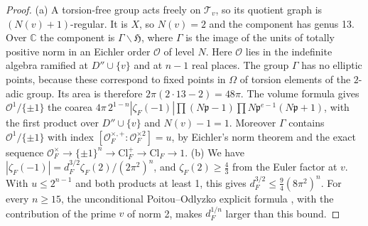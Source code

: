 \documentclass[11pt]{amsart}
\numberwithin{equation}{section}
\theoremstyle{plain}
\theoremstyle{definition}\newtheorem{definition}[theorem]{Definition}
\theoremstyle{remark}\newtheorem{remark}[theorem]{Remark}
\begin{document}
\begin{proof}
(a) A torsion-free group acts freely on $\mathcal T_v$, so its quotient graph is $(N(v)+1)$-regular. It is $X$, so $N(v)=2$ and the component has genus 13. Over $\mathbb C$ the component is $\Gamma\backslash\mathfrak H$, where $\Gamma$ is the image of the units of totally positive norm in an Eichler order $\mathcal O$ of level $N$. Here $\mathcal O$ lies in the indefinite algebra ramified at $D''\cup\{v\}$ and at $n-1$ real places. The group $\Gamma$ has no elliptic points, because these correspond to fixed points in $\Omega$ of torsion elements of the $2$-adic group. Its area is therefore $2\pi(2\cdot13-2)=48\pi$. The volume formula \cite{voight21} gives $\mathcal O^1/\{\pm1\}$ the coarea $4\pi\,2^{1-n}|\zeta_F(-1)|\prod(N\mathfrak p-1)\prod N\mathfrak p^{e-1}(N\mathfrak p+1)$, with the first product over $D''\cup\{v\}$ and $N(v)-1=1$. Moreover $\Gamma$ contains $\mathcal O^1/\{\pm1\}$ with index $[\mathcal O_F^{\times,+}:\mathcal O_F^{\times2}]=u$, by Eichler's norm theorem and the exact sequence $\mathcal O_F^\times\to\{\pm1\}^n\to\mathrm{Cl}^+_F\to\mathrm{Cl}_F\to1$.
(b) We have $|\zeta_F(-1)|=d_F^{3/2}\zeta_F(2)/(2\pi^2)^n$, and $\zeta_F(2)\ge\frac43$ from the Euler factor at $v$. With $u\le2^{n-1}$ and both products at least 1, this gives $d_F^{3/2}\le\frac94(8\pi^2)^n$. For every $n\ge15$, the unconditional Poitou--Odlyzko explicit formula \cite{poitou77,odlyzko76,odlyzko90}, with the contribution of the prime $v$ of norm 2, makes $d_F^{1/n}$ larger than this bound.

\end{proof}
\end{document}
